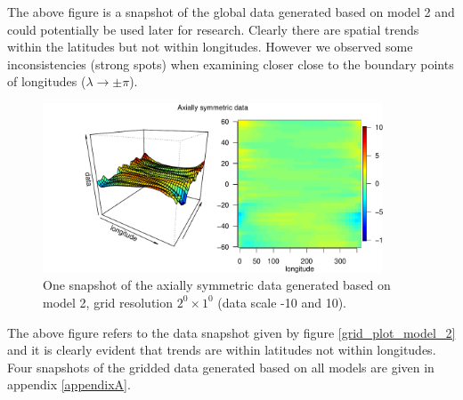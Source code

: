 The above figure is a snapshot of the global data generated based on model 2 and could potentially be used later for research. Clearly there are spatial trends within the latitudes but not within longitudes. However we observed some inconsistencies (strong spots) when examining closer close to the boundary points of longitudes ($\lambda \rightarrow \pm \pi$).

\begin{figure}[H]
	\label{grid_plot_model2_sim2}
	\begin{center}
		\includegraphics [width=0.9\textwidth ]{graphs/Data_sample_120_model2_density.pdf}
		\caption[One snapshot of the axially symmetric data generated based on model 2]{One snapshot of the axially symmetric data generated based on model 2, grid resolution $2^0\times 1^0$ (data scale -10 and 10).}
	\end{center}
\end{figure}
The above figure refers to the data snapshot given by figure \eqref{grid_plot_model_2} and it is clearly evident that trends are within latitudes not within longitudes. Four snapshots of the gridded data generated based on all models are given in appendix \ref{appendixA}.

%
